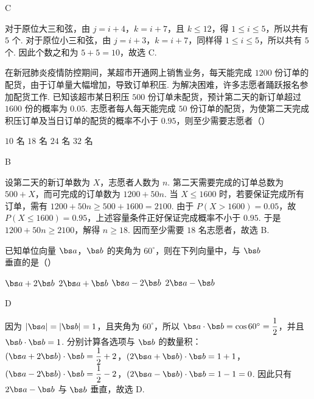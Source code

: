 \begin{answer}
C
\end{answer}

\begin{solution}
对于原位大三和弦，由 \(j=i+4\)，\(k=i+7\)，且 \(k\leq12\)，得 \(1\leq i\leq5\)，所以共有 \(5\) 个. 对于原位小三和弦，由 \(j=i+3\)，\(k=i+7\)，同样得 \(1\leq i\leq5\)，所以共有 \(5\) 个. 因此个数之和为 \(5+5=10\)，故选 C.
\end{solution}

\begin{problem}
在新冠肺炎疫情防控期间，某超市开通网上销售业务，每天能完成 \(1200\) 份订单的配货，由于订单量大幅增加，导致订单积压. 为解决困难，许多志愿者踊跃报名参加配货工作. 已知该超市某日积压 \(500\) 份订单未配货，预计第二天的新订单超过 \(1600\) 份的概率为 \(0.05\). 志愿者每人每天能完成 \(50\) 份订单的配货，为使第二天完成积压订单及当日订单的配货的概率不小于 \(0.95\)，则至少需要志愿者（\quad）

\choices
    {\(10\text{ 名}\)}
    {\(18\text{ 名}\)}
    {\(24\text{ 名}\)}
    {\(32\text{ 名}\)}
\end{problem}

\begin{answer}
B
\end{answer}

\begin{solution}
设第二天的新订单数为 \(X\)，志愿者人数为 \(n\). 第二天需要完成的订单总数为 \(500+X\)，而可完成的订单数为 \(1200+50n\). 当 \(X\leq1600\) 时，若要保证完成所有订单，需有 \(1200+50n\geq500+1600=2100\). 由于 \(P(X>1600)=0.05\)，故 \(P(X\leq1600)=0.95\)，上述容量条件正好保证完成概率不小于 \(0.95\). 于是 \(1200+50n\geq2100\)，解得 \(n\geq18\). 因而至少需要 \(18\) 名志愿者，故选 B.
\end{solution}

\begin{problem}
已知单位向量 \(\bs a\)，\(\bs b\) 的夹角为 \(60^\circ\)，则在下列向量中，与 \(\bs b\) 垂直的是（\quad）

\choices
    {\(\bs a+2\bs b\)}
    {\(2\bs a+\bs b\)}
    {\(\bs a-2\bs b\)}
    {\(2\bs a-\bs b\)}
\end{problem}

\begin{answer}
D
\end{answer}

\begin{solution}
因为 \(\lvert\bs a\rvert=\lvert\bs b\rvert=1\)，且夹角为 \(60^\circ\)，所以 \(\bs a\cdot\bs b=\cos60^\circ=\dfrac12\)，并且 \(\bs b\cdot\bs b=1\). 分别计算各选项与 \(\bs b\) 的数量积：
\(\left(\bs a+2\bs b\right)\cdot\bs b=\dfrac12+2\)，\(\left(2\bs a+\bs b\right)\cdot\bs b=1+1\)，\(\left(\bs a-2\bs b\right)\cdot\bs b=\dfrac12-2\)，\(\left(2\bs a-\bs b\right)\cdot\bs b=1-1=0\). 因此只有 \(2\bs a-\bs b\) 与 \(\bs b\) 垂直，故选 D.
\end{solution}

